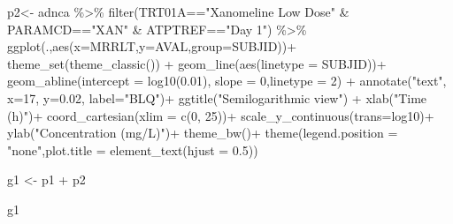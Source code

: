 \documentclass[
  letterpaper,
  DIV=11,
  numbers=noendperiod]{scrreprt}
\newenvironment{Shaded}{\begin{snugshade}}{\end{snugshade}}
\newcommand{\AttributeTok}[1]{\textcolor[rgb]{0.40,0.45,0.13}{#1}}
\newcommand{\DecValTok}[1]{\textcolor[rgb]{0.68,0.00,0.00}{#1}}
\newcommand{\FloatTok}[1]{\textcolor[rgb]{0.68,0.00,0.00}{#1}}
\newcommand{\FunctionTok}[1]{\textcolor[rgb]{0.28,0.35,0.67}{#1}}
\newcommand{\NormalTok}[1]{\textcolor[rgb]{0.00,0.23,0.31}{#1}}
\newcommand{\OtherTok}[1]{\textcolor[rgb]{0.00,0.23,0.31}{#1}}
\newcommand{\SpecialCharTok}[1]{\textcolor[rgb]{0.37,0.37,0.37}{#1}}
\newcommand{\StringTok}[1]{\textcolor[rgb]{0.13,0.47,0.30}{#1}}
\begin{document}
\begin{Shaded}
\begin{Highlighting}[]
\NormalTok{p2}\OtherTok{\textless{}{-}}\NormalTok{ adnca }\SpecialCharTok{\%\textgreater{}\%} 
  \FunctionTok{filter}\NormalTok{(TRT01A}\SpecialCharTok{==}\StringTok{"Xanomeline Low Dose"} \SpecialCharTok{\&} 
\NormalTok{        PARAMCD}\SpecialCharTok{==}\StringTok{"XAN"} \SpecialCharTok{\&}\NormalTok{ ATPTREF}\SpecialCharTok{==}\StringTok{"Day 1"}\NormalTok{) }\SpecialCharTok{\%\textgreater{}\%}
  \FunctionTok{ggplot}\NormalTok{(.,}\FunctionTok{aes}\NormalTok{(}\AttributeTok{x=}\NormalTok{MRRLT,}\AttributeTok{y=}\NormalTok{AVAL,}\AttributeTok{group=}\NormalTok{SUBJID))}\SpecialCharTok{+}
  \FunctionTok{theme\_set}\NormalTok{(}\FunctionTok{theme\_classic}\NormalTok{()) }\SpecialCharTok{+}
  \FunctionTok{geom\_line}\NormalTok{(}\FunctionTok{aes}\NormalTok{(}\AttributeTok{linetype =}\NormalTok{ SUBJID))}\SpecialCharTok{+}
  \FunctionTok{geom\_abline}\NormalTok{(}\AttributeTok{intercept =} \FunctionTok{log10}\NormalTok{(}\FloatTok{0.01}\NormalTok{), }\AttributeTok{slope =} \DecValTok{0}\NormalTok{,}\AttributeTok{linetype =} \DecValTok{2}\NormalTok{) }\SpecialCharTok{+}
  \FunctionTok{annotate}\NormalTok{(}\StringTok{"text"}\NormalTok{, }\AttributeTok{x=}\DecValTok{17}\NormalTok{, }\AttributeTok{y=}\FloatTok{0.02}\NormalTok{, }\AttributeTok{label=}\StringTok{"BLQ"}\NormalTok{)}\SpecialCharTok{+}
  \FunctionTok{ggtitle}\NormalTok{(}\StringTok{"Semilogarithmic view"}\NormalTok{) }\SpecialCharTok{+}
  \FunctionTok{xlab}\NormalTok{(}\StringTok{"Time (h)"}\NormalTok{)}\SpecialCharTok{+}
  \FunctionTok{coord\_cartesian}\NormalTok{(}\AttributeTok{xlim =} \FunctionTok{c}\NormalTok{(}\DecValTok{0}\NormalTok{, }\DecValTok{25}\NormalTok{))}\SpecialCharTok{+}
  \FunctionTok{scale\_y\_continuous}\NormalTok{(}\AttributeTok{trans=}\StringTok{\textquotesingle{}log10\textquotesingle{}}\NormalTok{)}\SpecialCharTok{+}
  \FunctionTok{ylab}\NormalTok{(}\StringTok{"Concentration (mg/L)"}\NormalTok{)}\SpecialCharTok{+}
  \FunctionTok{theme\_bw}\NormalTok{()}\SpecialCharTok{+} 
  \FunctionTok{theme}\NormalTok{(}\AttributeTok{legend.position =} \StringTok{"none"}\NormalTok{,}\AttributeTok{plot.title =} \FunctionTok{element\_text}\NormalTok{(}\AttributeTok{hjust =} \FloatTok{0.5}\NormalTok{))}

\NormalTok{g1 }\OtherTok{\textless{}{-}}\NormalTok{ p1 }\SpecialCharTok{+}\NormalTok{ p2}

\NormalTok{g1}
\end{Highlighting}
\end{Shaded}
\end{document}
